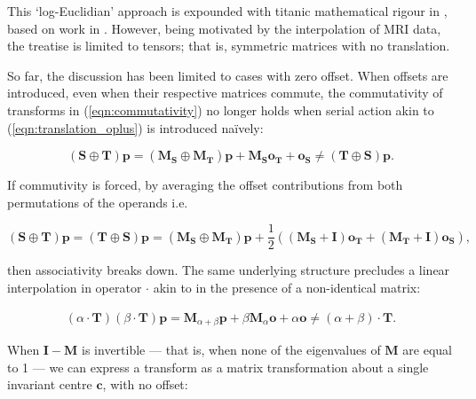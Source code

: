         This `log-Euclidian' approach is expounded with titanic mathematical rigour in \cite{Arsigny2005,Arsigny2005a,Pennec2006}, based on work in \cite{Pennec2006a}. However, being motivated by the interpolation of MRI data, the treatise is limited to tensors; that is, symmetric matrices with no translation.
        
		    So far, the discussion has been limited to cases with zero offset. When offsets are introduced, even when their respective matrices commute, the commutativity of transforms in (\ref{eqn:commutativity}) no longer holds when serial action akin to (\ref{eqn:translation_oplus}) is introduced na\"ively:
		    
        \begin{equation}
          (\mathbf{S} \oplus \mathbf{T})\mathbf{p} = (\mathbf{M_S} \oplus \mathbf{M_T})\mathbf{p} + \mathbf{M_So_T} + \mathbf{o_S} \ne (\mathbf{T} \oplus \mathbf{S})\mathbf{p}.
        \end{equation}
        
        If commutivity is forced, by averaging the offset contributions from both permutations of the operands i.e.
        
        \begin{equation}
          (\mathbf{S} \oplus \mathbf{T})\mathbf{p} = (\mathbf{T} \oplus \mathbf{S})\mathbf{p} = (\mathbf{M_S} \oplus \mathbf{M_T})\mathbf{p} + \frac{1}{2}\left(\left( \mathbf{M_S} + \mathbf{I} \right) \mathbf{o_T} + \left( \mathbf{M_T} + \mathbf{I} \right)\mathbf{o_S}\right),
        \end{equation}

        then associativity breaks down. The same underlying structure precludes a linear interpolation in operator $\cdot$ akin to  in the presence of a non-identical matrix:
        
        \begin{gather}
          (\alpha \cdot \mathbf{T})(\beta \cdot \mathbf{T})\mathbf{p} = \mathbf{M}_{\alpha+\beta}\mathbf{p} + \beta\mathbf{M}_{\alpha}\mathbf{o} + \alpha\mathbf{o} \ne (\alpha + \beta) \cdot \mathbf{T}.
        \end{gather}
        
        When $\mathbf{I} - \mathbf{M}$ is invertible --- that is, when none of the eigenvalues of $\mathbf{M}$ are equal to 1 --- we can express a transform as a matrix transformation about a single invariant centre $\mathbf{c}$, with no offset:
        
